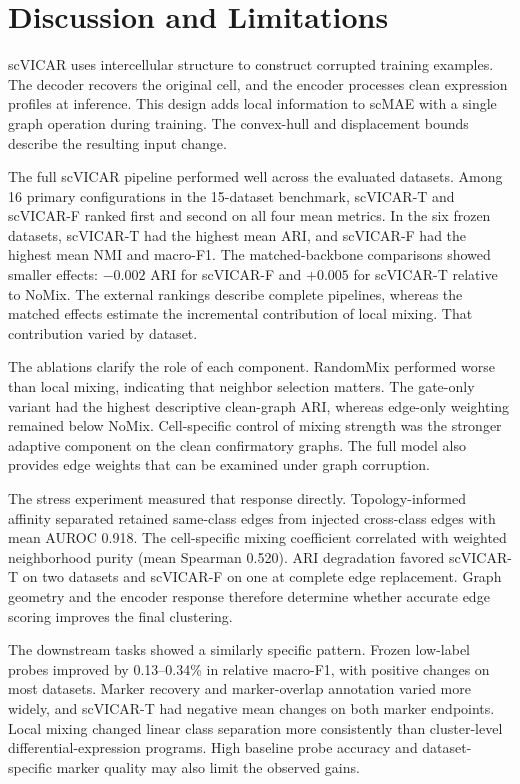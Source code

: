 \section{Discussion and Limitations}
\label{sec:discussion}

scVICAR uses intercellular structure to construct corrupted training examples.
The decoder recovers the original cell, and the encoder processes clean
expression profiles at inference. This design adds local information to scMAE
with a single graph operation during training. The convex-hull and displacement
bounds describe the resulting input change.

The full scVICAR pipeline performed well across the evaluated datasets. Among
16 primary configurations in the 15-dataset benchmark, scVICAR-T and scVICAR-F ranked
first and second on all four mean metrics. In the six frozen datasets,
scVICAR-T had the highest mean ARI, and scVICAR-F had the highest mean NMI and
macro-F1. The matched-backbone comparisons showed smaller
effects: $-0.002$ ARI for scVICAR-F and $+0.005$ for scVICAR-T relative to
NoMix. The external rankings describe complete pipelines, whereas the matched
effects estimate the incremental contribution of local mixing. That
contribution varied by dataset.

The ablations clarify the role of each component. RandomMix performed worse
than local mixing, indicating that neighbor selection matters. The gate-only
variant had the highest descriptive clean-graph ARI, whereas edge-only
weighting remained below NoMix. Cell-specific control of mixing strength was
the stronger adaptive component on the clean confirmatory graphs.
The full model also provides edge weights that can be examined under graph
corruption.

The stress experiment measured that response directly. Topology-informed
affinity separated retained same-class edges from injected cross-class edges
with mean AUROC 0.918. The cell-specific mixing coefficient correlated with
weighted neighborhood purity (mean Spearman 0.520). ARI degradation favored
scVICAR-T on two datasets and scVICAR-F on one at complete edge replacement.
Graph geometry and the encoder response therefore determine whether accurate
edge scoring improves the final clustering.

The downstream tasks showed a similarly specific pattern. Frozen low-label
probes improved by 0.13--0.34\% in relative macro-F1, with positive changes on
most datasets. Marker recovery and marker-overlap annotation varied more
widely, and scVICAR-T had negative mean changes on both marker endpoints.
Local mixing changed linear class separation more consistently than
cluster-level differential-expression programs. High baseline probe accuracy and
dataset-specific marker quality may also limit the observed gains.

